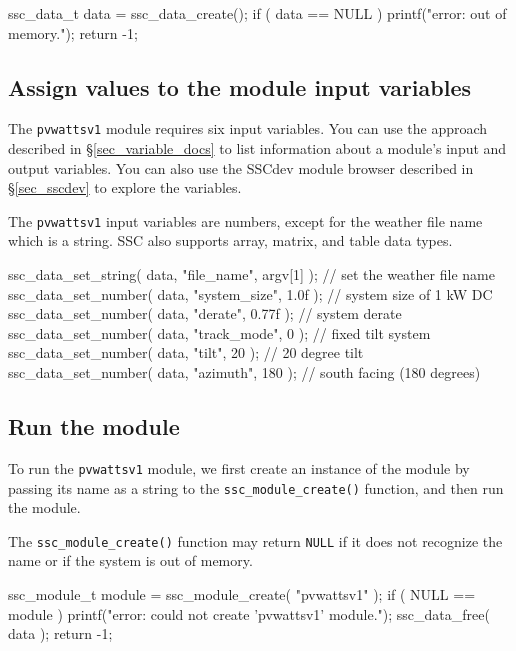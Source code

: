 \documentclass{article}
\begin{document}
\begin{verbatimtab}[4]
	ssc_data_t data = ssc_data_create();
	if ( data == NULL )
	{
		printf("error: out of memory.\n");
		return -1;
	}
\end{verbatimtab}

\subsection{Assign values to the module input variables}

The \texttt{pvwattsv1} module requires six input variables. You can use the approach described in \S\ref{sec_variable_docs} to list information about a module's input and output variables. You can also use the SSCdev module browser described in \S\ref{sec_sscdev} to explore the variables.

The \texttt{pvwattsv1} input variables are numbers, except for the weather file name which is a string. SSC also supports array, matrix, and table data types.

\begin{verbatimtab}[4]
	ssc_data_set_string( data, "file_name", argv[1] ); // set the weather file name
	ssc_data_set_number( data, "system_size", 1.0f );  // system size of 1 kW DC
	ssc_data_set_number( data, "derate", 0.77f );      // system derate
	ssc_data_set_number( data, "track_mode", 0 );      // fixed tilt system
	ssc_data_set_number( data, "tilt", 20 );           // 20 degree tilt
	ssc_data_set_number( data, "azimuth", 180 );       // south facing (180 degrees)
\end{verbatimtab}

\subsection{Run the module}
\label{sec_run_module}

To run the \texttt{pvwattsv1} module, we first create an instance of the module by passing its name as a string to the \texttt{ssc\_module\_create()} function, and then run the module. 

The \texttt{ssc\_module\_create()} function may return \texttt{NULL} if it does not recognize the name or if the system is out of memory.

\begin{verbatimtab}[4]
	ssc_module_t module = ssc_module_create( "pvwattsv1" );
	if ( NULL == module )
	{
		printf("error: could not create 'pvwattsv1' module.\n");
		ssc_data_free( data );
		return -1;
	}
\end{verbatimtab}
\end{document}
